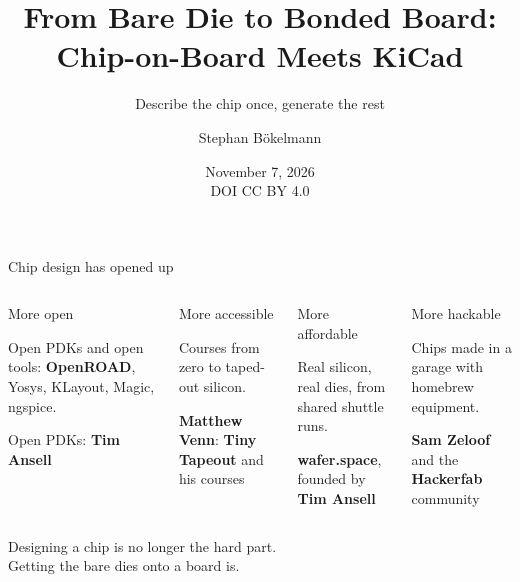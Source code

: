 \documentclass[aspectratio=169,11pt]{beamer}
\title{From Bare Die to Bonded Board:\\Chip-on-Board Meets KiCad}
\subtitle{Describe the chip once, generate the rest}
\author{Stephan Bökelmann}
\institute{\texttt{maxclerkwell.tech}}
\date{November 7, 2026\\[0.8em]{\scriptsize\color{cobgrey}DOI \talkdoi\quad CC BY 4.0}}
\newcommand{\halves}[2]{\parbox[t][3.3cm][s]{\linewidth}{\raggedright #1\vfill\raggedright\footnotesize #2}}
\begin{document}
\begin{frame}[plain]
  \titlepage
\end{frame}

\begin{frame}{Chip design has opened up}
  \small
  \begin{columns}[T,onlytextwidth]
      \begin{block}{More open}
        \halves{Open PDKs and open tools: \textbf{OpenROAD}, Yosys, KLayout, Magic, ngspice.}
               {Open PDKs: \textbf{Tim Ansell}}
      \end{block}
      \begin{block}{More accessible}
        \halves{Courses from zero to taped-out silicon.}
               {\textbf{Matthew Venn}: \textbf{Tiny Tapeout} and his courses}
      \end{block}
      \begin{block}{More affordable}
        \halves{Real silicon, real dies, from shared shuttle runs.}
               {\textbf{wafer.space}, founded by \textbf{Tim Ansell}}
      \end{block}
      \begin{block}{More hackable}
        \halves{Chips made in a garage with homebrew equipment.}
               {\textbf{Sam Zeloof} and the \textbf{Hackerfab} community}
      \end{block}
  \end{columns}
  \vfill
  \begin{center}
    \Large Designing a chip is no longer the hard part.\\
    \color{cobgrey}\normalsize Getting the bare dies onto a board is.
  \end{center}
  \vfill
\end{frame}
\end{document}
